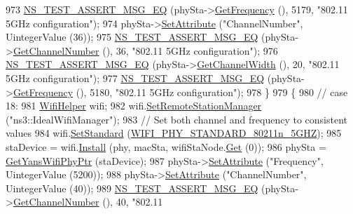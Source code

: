 \begin{DoxyCode}
973     \hyperlink{group__testing_ga2a9d78cffb3db8e867c35fff0b698cf5}{NS\_TEST\_ASSERT\_MSG\_EQ} (phySta->\hyperlink{classns3_1_1WifiPhy_ad2508d94faf22d690d6b8b4367934fd1}{GetFrequency} (), 5179, \textcolor{stringliteral}{"802.11 5GHz
       configuration"});
974     phySta->\hyperlink{classns3_1_1ObjectBase_ac60245d3ea4123bbc9b1d391f1f6592f}{SetAttribute} (\textcolor{stringliteral}{"ChannelNumber"}, UintegerValue (36));
975     \hyperlink{group__testing_ga2a9d78cffb3db8e867c35fff0b698cf5}{NS\_TEST\_ASSERT\_MSG\_EQ} (phySta->\hyperlink{classns3_1_1WifiPhy_a5cf0ccf06109ace61db51c83e91b7e8d}{GetChannelNumber} (), 36, \textcolor{stringliteral}{"802.11
       5GHz configuration"});
976     \hyperlink{group__testing_ga2a9d78cffb3db8e867c35fff0b698cf5}{NS\_TEST\_ASSERT\_MSG\_EQ} (phySta->\hyperlink{classns3_1_1WifiPhy_a4a5d5009b3b3308f2baeed42a2007189}{GetChannelWidth} (), 20, \textcolor{stringliteral}{"802.11 5GHz
       configuration"});
977     \hyperlink{group__testing_ga2a9d78cffb3db8e867c35fff0b698cf5}{NS\_TEST\_ASSERT\_MSG\_EQ} (phySta->\hyperlink{classns3_1_1WifiPhy_ad2508d94faf22d690d6b8b4367934fd1}{GetFrequency} (), 5180, \textcolor{stringliteral}{"802.11 5GHz
       configuration"});
978   \}
979   \{
980     \textcolor{comment}{// case 18:}
981     \hyperlink{classns3_1_1WifiHelper}{WifiHelper} wifi;
982     wifi.\hyperlink{classns3_1_1WifiHelper_a3d01b178aeb2de246ab5a3aa5638ce24}{SetRemoteStationManager} (\textcolor{stringliteral}{"ns3::IdealWifiManager"});
983     \textcolor{comment}{// Set both channel and frequency to consistent values}
984     wifi.\hyperlink{classns3_1_1WifiHelper_aa54f3e61527ef8de318d310045bc5dfd}{SetStandard} (\hyperlink{group__wifi_gga1299834f4e1c615af3ca738033b76a49aaabe94a0be4668583c42595437b4a6c0}{WIFI\_PHY\_STANDARD\_80211n\_5GHZ});
985     staDevice = wifi.\hyperlink{classns3_1_1WifiHelper_a451b3d33fa1497c22f06c5451f57a127}{Install} (phy, macSta, wifiStaNode.\hyperlink{classns3_1_1NodeContainer_a9ed96e2ecc22e0f5a3d4842eb9bf90bf}{Get} (0));
986     phySta = \hyperlink{classSetChannelFrequencyTest_aa30a0a39f98c2d825152681ba8b9f4e1}{GetYansWifiPhyPtr} (staDevice);
987     phySta->\hyperlink{classns3_1_1ObjectBase_ac60245d3ea4123bbc9b1d391f1f6592f}{SetAttribute} (\textcolor{stringliteral}{"Frequency"}, UintegerValue (5200));
988     phySta->\hyperlink{classns3_1_1ObjectBase_ac60245d3ea4123bbc9b1d391f1f6592f}{SetAttribute} (\textcolor{stringliteral}{"ChannelNumber"}, UintegerValue (40));
989     \hyperlink{group__testing_ga2a9d78cffb3db8e867c35fff0b698cf5}{NS\_TEST\_ASSERT\_MSG\_EQ} (phySta->\hyperlink{classns3_1_1WifiPhy_a5cf0ccf06109ace61db51c83e91b7e8d}{GetChannelNumber} (), 40, \textcolor{stringliteral}{"802.11
}
\end{DoxyCode}
